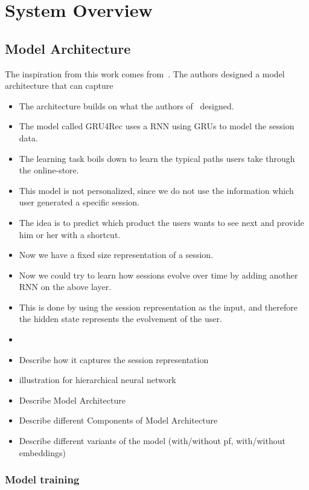 \chapter{System Overview}

\section{Model Architecture}\label{sec:model_arch}
The inspiration from this work comes from~\cite{hierarchical}.
The authors designed a model architecture that can capture 
\begin{itemize}
    \item The architecture builds on what the authors of~\cite{gru4rec} designed.
    \item The model called GRU4Rec uses a RNN using GRUs to model the session data.
    \item The learning task boils down to learn the typical paths users take through the online-store.
    \item This model is not personalized, since we do not use the information which user generated a specific session.
    \item The idea is to predict which product the users wants to see next and provide him or her with a shortcut.
    \item Now we have a fixed size representation of a session.
    \item Now we could try to learn how sessions evolve over time by adding another RNN on the above layer.
    \item This is done by using the session representation as the input, and therefore the hidden state represents the evolvement of the user.
    \item 
    \item Describe how it captures the session representation
    \item illustration for hierarchical neural network
    \item Describe Model Architecture
    \item Describe different Components of Model Architecture
\item Describe different variants of the model (with/without pf, with/without embeddings)
\end{itemize}
\subsection{Model training}
